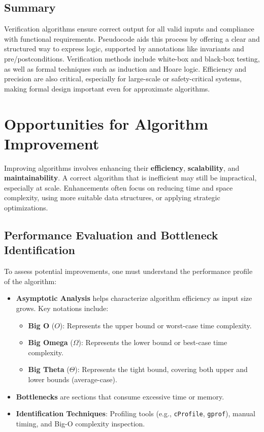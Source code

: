 \documentclass[12pt]{article}
\begin{document}
\subsection*{Summary}

Verification algorithms ensure correct output for all valid inputs and compliance with functional requirements. Pseudocode aids this process by offering a clear and structured way to express logic, supported by annotations like invariants and pre/postconditions. Verification methods include white-box and black-box testing, as well as formal techniques such as induction and Hoare logic. Efficiency and precision are also critical, especially for large-scale or safety-critical systems, making formal design important even for approximate algorithms.





\section{Opportunities for Algorithm Improvement}

Improving algorithms involves enhancing their \textbf{efficiency}, \textbf{scalability}, and \textbf{maintainability}. A correct algorithm that is inefficient may still be impractical, especially at scale. Enhancements often focus on reducing time and space complexity, using more suitable data structures, or applying strategic optimizations.

\subsection{Performance Evaluation and Bottleneck Identification}

To assess potential improvements, one must understand the performance profile of the algorithm:
\begin{itemize}
    \item \textbf{Asymptotic Analysis} helps characterize algorithm efficiency as input size grows. Key notations include: \label{sec:notation}
    \begin{itemize}
        \item \textbf{Big O} (\(O\)): Represents the upper bound or worst-case time complexity.
        \item \textbf{Big Omega} (\(\Omega\)): Represents the lower bound or best-case time complexity.
        \item \textbf{Big Theta} (\(\Theta\)): Represents the tight bound, covering both upper and lower bounds (average-case).
    \end{itemize}
    \item \textbf{Bottlenecks} are sections that consume excessive time or memory.
    \item \textbf{Identification Techniques}: Profiling tools (e.g., \texttt{cProfile}, \texttt{gprof}), manual timing, and Big-O complexity inspection.
\end{itemize}
\end{document}
